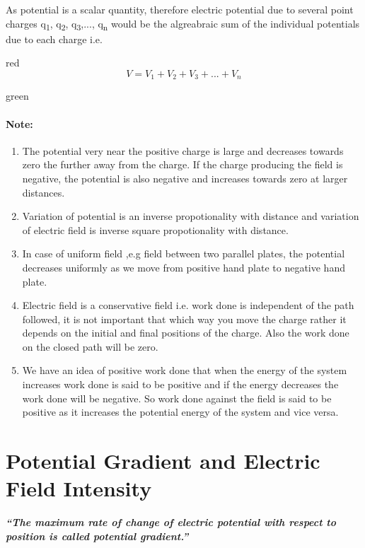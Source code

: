 As potential is a scalar quantity, therefore electric potential due to
several point charges q\textsubscript{1}, q\textsubscript{2}, q\textsubscript{3},..., q\textsubscript{n}
would be the algreabraic sum of the individual potentials due to each
charge i.e.
\begin{mybox}{red}{}
\begin{equation}
  V = V_{1} +V_{2} + V_{3} + ... + V_{n}
\end{equation}
\end{mybox}
\begin{mybox}{green}{}
\paragraph{Note:}
\begin{enumerate}[label = (\roman*)]
\item The potential very near the positive charge is large and decreases
towards zero the further away from the charge. If the charge producing the
field is negative, the potential is also negative and increases towards zero
at larger distances.
\item Variation of potential is an inverse propotionality with distance
and variation of electric field is inverse square propotionality with
distance.
\item In case of uniform field ,e.g field between two parallel plates,
the potential decreases uniformly as we move from positive hand plate
to negative hand plate.
\item Electric field is a conservative field i.e. work done is independent
of the path followed, it is not important that which way you move the
charge rather it depends on the initial and final positions of the charge.
Also the work done on the closed path will be zero.
\item We have an idea of positive work done that when the energy of the
system increases work done is said to be positive and if the energy
decreases the work done will be negative. So work done against the
field is said to be positive as it increases the potential energy
of the system and vice versa.
\end{enumerate}
\end{mybox}
\section{Potential Gradient and Electric Field Intensity}
\textit{\textbf{“The maximum rate of change of electric potential 
with respect to position is called potential gradient.”}}

